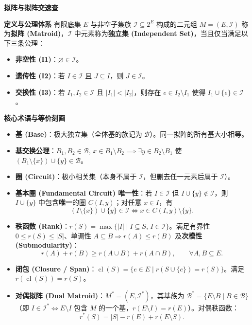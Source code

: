 \textbf{拟阵与拟阵交速查}

\textbf{定义与公理体系}
有限底集 $E$ 与非空子集族 $\mathcal{I}\subseteq 2^E$ 构成的二元组 $M=(E,\mathcal{I})$ 称为\textbf{拟阵 (Matroid)}，$\mathcal{I}$ 中元素称为\textbf{独立集 (Independent Set)}，当且仅当满足以下三条公理：
\begin{itemize}
    \item \textbf{非空性 (I1)}：$\varnothing\in\mathcal{I}$。
    \item \textbf{遗传性 (I2)}：若 $I\in\mathcal{I}$ 且 $J\subseteq I$，则 $J\in\mathcal{I}$。
    \item \textbf{交换性 (I3)}：若 $I_1,I_2\in\mathcal{I}$ 且 $|I_1|<|I_2|$，则存在 $e\in I_2\setminus I_1$ 使得 $I_1\cup\{e\}\in\mathcal{I}$。
\end{itemize}

\textbf{核心术语与等价刻画}
\begin{itemize}
    \item \textbf{基 (Base)}：极大独立集（全体基的族记为 $\mathcal{B}$）。同一拟阵的所有基大小相等。
    \item \textbf{基交换公理}：$B_1,B_2\in\mathcal{B},\,x\in B_1\setminus B_2 \implies \exists y\in B_2\setminus B_1$ 使 $(B_1\setminus\{x\})\cup\{y\}\in\mathcal{B}$。
    \item \textbf{圈 (Circuit)}：极小相关集（本身不属于 $\mathcal{I}$，但删去任一元素后属于 $\mathcal{I}$）。
    \item \textbf{基本圈 (Fundamental Circuit) 唯一性}：若 $I\in\mathcal{I}$ 但 $I\cup\{y\}\notin\mathcal{I}$，则 $I\cup\{y\}$ 中包含\textbf{唯一}的圈 $C(I,y)$；对任意 $x\in I$，有
    \[
    (I\setminus\{x\})\cup\{y\}\in\mathcal{I} \iff x\in C(I,y)\setminus\{y\}.
    \]
    \item \textbf{秩函数 (Rank)}：$r(S)=\max\{|I|\mid I\subseteq S,\,I\in\mathcal{I}\}$。满足有界性 $0\le r(S)\le |S|$、单调性 $A\subseteq B\Rightarrow r(A)\le r(B)$ 及\textbf{次模性 (Submodularity)}：
    \[
    r(A)+r(B)\ge r(A\cup B)+r(A\cap B),\qquad \forall A,B\subseteq E.
    \]
    \item \textbf{闭包 (Closure / Span)}：$\operatorname{cl}(S)=\{e\in E\mid r(S\cup\{e\})=r(S)\}$。满足 $r(\operatorname{cl}(S))=r(S)$。
    \item \textbf{对偶拟阵 (Dual Matroid)}：$M^*=(E,\mathcal{I}^*)$，其基族为 $\mathcal{B}^*=\{E\setminus B\mid B\in\mathcal{B}\}$（即 $I\in\mathcal{I}^*\iff E\setminus I$ 包含 $M$ 的一个基，$r(E\setminus I)=r(E)$）。对偶秩函数：
    \[
    r^*(S)=|S|-r(E)+r(E\setminus S).
    \]
\end{itemize}


